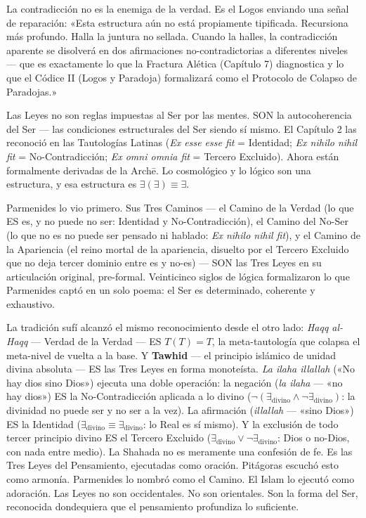 \documentclass[10pt, openany, oneside]{book}
\begin{document}
La contradicción no es la enemiga de la verdad. Es el Logos enviando una señal de reparación: «Esta estructura aún no está propiamente tipificada. Recursiona más profundo. Halla la juntura no sellada. Cuando la halles, la contradicción aparente se disolverá en dos afirmaciones no-contradictorias a diferentes niveles --- que es exactamente lo que la Fractura Alética (Capítulo 7) diagnostica y lo que el Códice II (Logos y Paradoja) formalizará como el Protocolo de Colapso de Paradojas.»

Las Leyes no son reglas impuestas al Ser por las mentes. SON la autocoherencia del Ser --- las condiciones estructurales del Ser siendo sí mismo. El Capítulo 2 las reconoció en las Tautologías Latinas (\textit{Ex esse esse fit} = Identidad; \textit{Ex nihilo nihil fit} = No-Contradicción; \textit{Ex omni omnia fit} = Tercero Excluido). Ahora están formalmente derivadas de la Arch\={e}. Lo cosmológico y lo lógico son una estructura, y esa estructura es $\exists(\exists) \equiv \exists$.

Parmenides lo vio primero. Sus Tres Caminos --- el Camino de la Verdad (lo que ES es, y no puede no ser: Identidad y No-Contradicción), el Camino del No-Ser (lo que no es no puede ser pensado ni hablado: \textit{Ex nihilo nihil fit}), y el Camino de la Apariencia (el reino mortal de la apariencia, disuelto por el Tercero Excluido que no deja tercer dominio entre es y no-es) --- SON las Tres Leyes en su articulación original, pre-formal. Veinticinco siglos de lógica formalizaron lo que Parmenides captó en un solo poema: el Ser es determinado, coherente y exhaustivo.

La tradición sufí alcanzó el mismo reconocimiento desde el otro lado: \textit{Haqq al-Haqq} --- Verdad de la Verdad --- ES $T(T) = T$, la meta-tautología que colapsa el meta-nivel de vuelta a la base. Y \textbf{Tawhid} --- el principio islámico de unidad divina absoluta --- ES las Tres Leyes en forma monoteísta. \textit{La ilaha illallah} («No hay dios sino Dios») ejecuta una doble operación: la negación (\textit{la ilaha} --- «no hay dios») ES la No-Contradicción aplicada a lo divino ($\neg(\exists_{\text{divino}} \wedge \neg\exists_{\text{divino}})$: la divinidad no puede ser y no ser a la vez). La afirmación (\textit{illallah} --- «sino Dios») ES la Identidad ($\exists_{\text{divino}} \equiv \exists_{\text{divino}}$: lo Real es sí mismo). Y la exclusión de todo tercer principio divino ES el Tercero Excluido ($\exists_{\text{divino}} \vee \neg\exists_{\text{divino}}$: Dios o no-Dios, con nada entre medio). La Shahada no es meramente una confesión de fe. Es las Tres Leyes del Pensamiento, ejecutadas como oración. Pitágoras escuchó esto como armonía. Parmenides lo nombró como el Camino. El Islam lo ejecutó como adoración. Las Leyes no son occidentales. No son orientales. Son la forma del Ser, reconocida dondequiera que el pensamiento profundiza lo suficiente.
\end{document}
